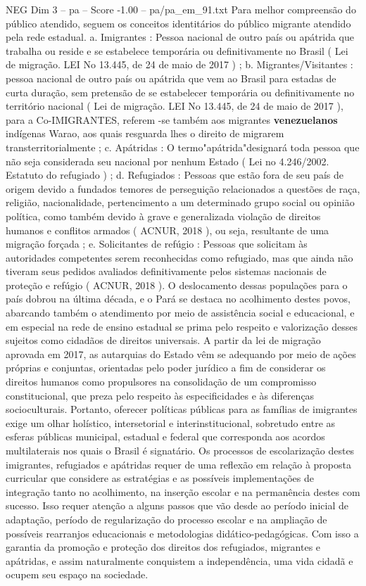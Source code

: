 \begin{textsample}{NEG Dim 3 – pa – Score -1.00 – pa/pa\_em\_91.txt}  \label{ex:f3_neg_051}
Para melhor compreensão do público atendido, seguem os conceitos identitários do público migrante atendido pela rede estadual. a.
Imigrantes : Pessoa nacional de outro país ou apátrida que trabalha ou reside e se estabelece temporária ou definitivamente no Brasil ( Lei de migração.
LEI No 13.445, de 24 de maio de 2017 ) ; b.
Migrantes/Visitantes : pessoa nacional de outro país ou apátrida que vem ao Brasil para estadas de curta duração, sem pretensão de se estabelecer temporária ou definitivamente no território nacional ( Lei de migração.
LEI No 13.445, de 24 de maio de 2017 ), para a Co-IMIGRANTES, referem -se também aos migrantes \textbf{venezuelanos} indígenas Warao, aos quais resguarda lhes o direito de migrarem transterritorialmente ; c.
Apátridas : O termo"apátrida"designará toda pessoa que não seja considerada seu nacional por nenhum Estado ( Lei no 4.246/2002.
Estatuto do refugiado ) ; d.
Refugiados : Pessoas que estão fora de seu país de origem devido a fundados temores de perseguição relacionados a questões de raça, religião, nacionalidade, pertencimento a um determinado grupo social ou opinião política, como também devido à grave e generalizada violação de direitos humanos e conflitos armados ( ACNUR, 2018 ), ou seja, resultante de uma migração forçada ; e.
Solicitantes de refúgio : Pessoas que solicitam às autoridades competentes serem reconhecidas como refugiado, mas que ainda não tiveram seus pedidos avaliados definitivamente pelos sistemas nacionais de proteção e refúgio ( ACNUR, 2018 ).
O deslocamento dessas populações para o país dobrou na última década, e o Pará se destaca no acolhimento destes povos, abarcando também o atendimento por meio de assistência social e educacional, e em especial na rede de ensino estadual se prima pelo respeito e valorização desses sujeitos como cidadãos de direitos universais.
A partir da lei de migração aprovada em 2017, as autarquias do Estado vêm se adequando por meio de ações próprias e conjuntas, orientadas pelo poder jurídico a fim de considerar os direitos humanos como propulsores na consolidação de um compromisso constitucional, que preza pelo respeito às especificidades e às diferenças socioculturais.
Portanto, oferecer políticas públicas para as famílias de imigrantes exige um olhar holístico, intersetorial e interinstitucional, sobretudo entre as esferas públicas municipal, estadual e federal que corresponda aos acordos multilaterais nos quais o Brasil é signatário.
Os processos de escolarização destes imigrantes, refugiados e apátridas requer de uma reflexão em relação à proposta curricular que considere as estratégias e as possíveis implementações de integração tanto no acolhimento, na inserção escolar e na permanência destes com sucesso.
Isso requer atenção a alguns passos que vão desde ao período inicial de adaptação, período de regularização do processo escolar e na ampliação de possíveis rearranjos educacionais e metodologias didático-pedagógicas.
Com isso a garantia da promoção e proteção dos direitos dos refugiados, migrantes e apátridas, e assim naturalmente conquistem a independência, uma vida cidadã e ocupem seu espaço na sociedade.

\end{textsample}
